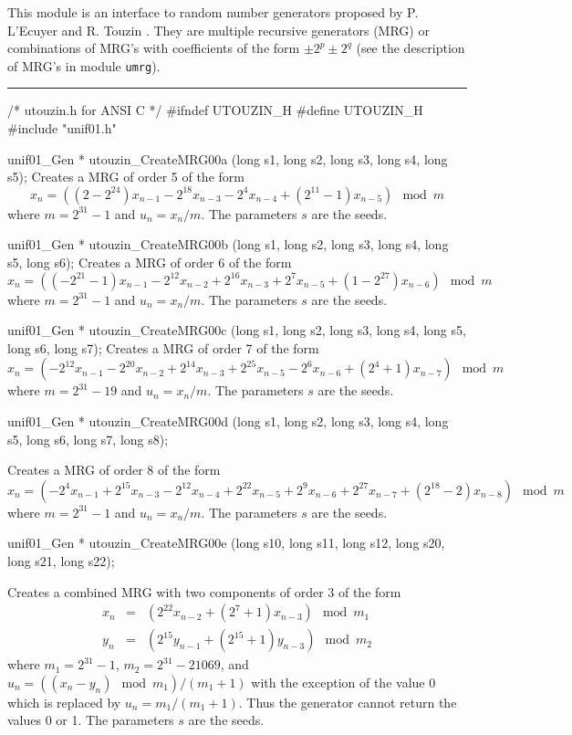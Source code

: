 
This module is an interface to random number generators proposed by
P. L'Ecuyer and R. Touzin \cite{rTOU01a}.
They are multiple recursive generators (MRG) or combinations of MRG's
with coefficients of the form $\pm2^p \pm 2^q$ 
(see the description of MRG's in module {\tt umrg}). 


\bigskip\hrule
\code\hide
/*  utouzin.h  for ANSI C */
#ifndef UTOUZIN_H
#define UTOUZIN_H
\endhide
#include "unif01.h"


unif01_Gen * utouzin_CreateMRG00a (long s1, long s2, long s3, long s4,
                                   long s5);
\endcode
  \tab Creates a MRG of order 5 of the form
$$
x_n = \left((2 -2^{24})x_{n-1} - 2^{18}x_{n-3} - 2^{4}x_{n-4}
  + (2^{11} - 1)x_{n-5}\right) \mod m
$$
where $ m = 2^{31} - 1$ and $u_n = x_n/m$. The parameters $s$ are the seeds.
 \endtab
\code


unif01_Gen * utouzin_CreateMRG00b (long s1, long s2, long s3, long s4,
                                   long s5, long s6);
\endcode
  \tab Creates a MRG of order 6 of the form
$$
x_n = \left((-2^{21} - 1)x_{n-1} - 2^{12}x_{n-2} + 2^{16}x_{n-3}
  + 2^{7}x_{n-5} + (1 - 2^{27})x_{n-6}\right) \mod m
$$
where $ m = 2^{31} - 1$ and $u_n = x_n/m$. The parameters $s$ are the seeds.
 \endtab
\code


unif01_Gen * utouzin_CreateMRG00c (long s1, long s2, long s3, long s4,
                                   long s5, long s6, long s7);
\endcode
  \tab Creates a MRG of order 7 of the form
$$
x_n = \left(-2^{12}x_{n-1} - 2^{20}x_{n-2} + 2^{14}x_{n-3}
  + 2^{25}x_{n-5} - 2^{6}x_{n-6} + (2^4 + 1)x_{n-7}\right) \mod m
$$
where $ m = 2^{31} - 19$ and $u_n = x_n/m$. The parameters $s$ are the seeds.
 \endtab
\code


unif01_Gen * utouzin_CreateMRG00d (long s1, long s2, long s3, long s4,
                                   long s5, long s6, long s7, long s8);

\endcode
  \tab Creates a MRG of order 8 of the form
$$
x_n = \left(-2^{4}x_{n-1} + 2^{15}x_{n-3} - 2^{12}x_{n-4} + 2^{22}x_{n-5} +
   2^{9}x_{n-6} + 2^{27}x_{n-7} + (2^{18} - 2)x_{n-8}\right) \mod m
$$
where $ m = 2^{31} - 1$ and $u_n = x_n/m$. The parameters $s$ are the seeds.
 \endtab
\code


unif01_Gen * utouzin_CreateMRG00e (long s10, long s11, long s12, 
                                   long s20, long s21, long s22);

\endcode
  \tab Creates a combined MRG with two components of order 3 of the form
\begin{eqnarray*}
x_n &=& \left(2^{22}x_{n-2}  + (2^{7} + 1)x_{n-3}\right) \mod m_1 \\
y_n &=& \left(2^{15}y_{n-1}  + (2^{15} + 1)y_{n-3}\right) \mod m_2
\end{eqnarray*}
where $m_1 = 2^{31} - 1$, $m_2 = 2^{31} - 21069$,  and $u_n = 
 \left((x_n - y_n)\mod m_1 \right)/(m_1+1)$ with the exception of the value
0 which is replaced by $u_n = m_1 /(m_1+1)$.  Thus the generator cannot return
the values 0 or 1.
 The parameters $s$ are the seeds.
 \endtab
\code



